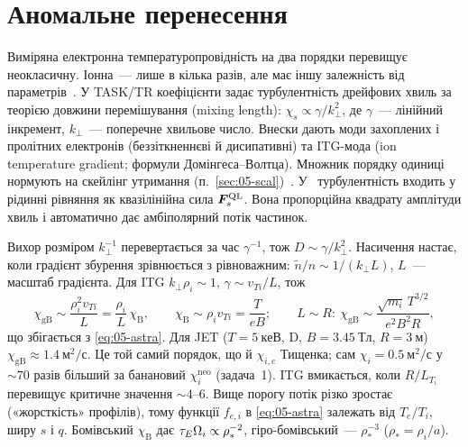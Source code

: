 \section{Аномальне перенесення}\label{sec:05-anom}

Виміряна електронна температуропровідність на два порядки перевищує неокласичну. Іонна~--- лише в кілька разів, але має іншу залежність від параметрів~\cite[с.~5]{Fukuyama1992}. У TASK/TR коефіцієнти задає турбулентність дрейфових хвиль за теорією довжини перемішування (mixing length): $\chi_{s}\propto\gamma/k_\perp^2$, де $\gamma$~--- лінійний інкремент, $k_\perp$~--- поперечне хвильове число. Внески дають моди захоплених і пролітних електронів (беззіткненнєві й дисипативні) та ITG-мода (ion temperature gradient; формули Домінгеса--Волтца). Множник порядку одиниці нормують на скейлінг утримання (п.~\ref{sec:05-scal})~\cite[с.~5, 8]{Fukuyama1992}. У~\cite[с.~3, (21)]{Seto2014} турбулентність входить у рідинні рівняння як квазілінійна сила $\bm{F}^{\mathrm{QL}}_s$. Вона пропорційна квадрату амплітуди хвиль і автоматично дає амбіполярний потік частинок.

\begin{outofcorpus}
Вихор розміром $k_\perp^{-1}$ перевертається за час $\gamma^{-1}$, тож $D\sim\gamma/k_\perp^2$. Насичення настає, коли градієнт збурення зрівнюється з рівноважним: $\tilde n/n\sim1/(k_\perp L)$, $L$~--- масштаб градієнта. Для ITG $k_\perp\rho_i\sim1$, $\gamma\sim v_{Ti}/L$, тож
\begin{equation}\label{eq:05-gB}
  \chi_{\mathrm{gB}}\sim\frac{\rho_i^2v_{Ti}}{L}=\frac{\rho_i}{L}\,\chi_{\mathrm B},\qquad \chi_{\mathrm B}\sim\rho_iv_{Ti}=\frac{T}{eB};\qquad
  L\sim R:\ \chi_{\mathrm{gB}}\sim\frac{\sqrt{m_i}\,T^{3/2}}{e^2B^2R},
\end{equation}
що збігається з \eqref{eq:05-astra}. Для JET ($T=\SI{5}{кеВ}$, D, $B=\SI{3,45}{Тл}$, $R=\SI{3}{м}$) $\chi_{\mathrm{gB}}\approx\SI{1,4}{м^2/с}$. Це той самий порядок, що й $\chi_{i,e}$ Тищенка; сам $\chi_i=\SI{0,5}{м^2/с}$ у $\sim70$ разів більший за банановий $\chi_i^{\mathrm{neo}}$ (задача~1). ITG вмикається, коли $R/L_{T_i}$ перевищує критичне значення $\sim4$--6. Вище порогу потік різко зростає («жорсткість» профілів), тому функції $f_{e,i}$ в \eqref{eq:05-astra} залежать від $T_e/T_i$, ширу $s$ і $q$. Бомівський $\chi_{\mathrm B}$ дає $\tau_{E}\Omega_{i}\propto\rho_*^{-2}$, гіро-бомівський~--- $\rho_*^{-3}$ ($\rho_*=\rho_i/a$).
\end{outofcorpus}

